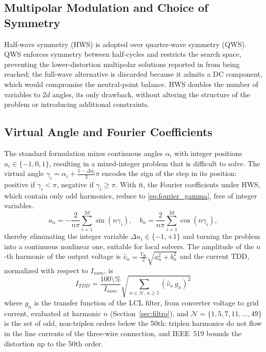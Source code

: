 \documentclass[conference]{IEEEtran}
\newcommand{\pct}{\text{\char`\%}}
\begin{document}
\subsection{Multipolar Modulation and Choice of Symmetry}

Half-wave symmetry (HWS) is adopted over quarter-wave symmetry (QWS). QWS
enforces symmetry between half-cycles and restricts the search space, preventing
the lower-distortion multipolar solutions reported in \cite{birth_genopp} from
being reached; the full-wave alternative is discarded because it admits a DC
component, which would compromise the neutral-point balance. HWS doubles the
number of variables to $2d$ angles, its only drawback, without altering the
structure of the problem or introducing additional constraints.

\subsection{Virtual Angle and Fourier Coefficients}

The standard formulation mixes continuous angles $\alpha_i$ with integer
positions $u_i \in \{-1,0,1\}$, resulting in a mixed-integer problem that is
difficult to solve. The virtual angle
$\gamma_i = \alpha_i + \frac{1-\Delta u_i}{2}\pi$ encodes the sign of the step in
its position: positive if $\gamma_i < \pi$, negative if $\gamma_i \geq \pi$. With
it, the Fourier coefficients under HWS, which contain only odd harmonics, reduce
to \eqref{eq:fourier_gamma}, free of integer variables.
\begin{equation}
    a_n = -\frac{2}{n\pi}\sum_{i=1}^{2d}\sin(n\gamma_i), \quad
    b_n =  \frac{2}{n\pi}\sum_{i=1}^{2d}\cos(n\gamma_i),
    \label{eq:fourier_gamma}
\end{equation}
thereby eliminating the integer variable $\Delta u_i \in \{-1,+1\}$ and turning
the problem into a continuous nonlinear one, suitable for local solvers. The
amplitude of the $n$-th harmonic of the output voltage is
$\hat{v}_n = \frac{V_{dc}}{2}\sqrt{a_n^2+b_n^2}$ and the current TDD, normalized
with respect to $I_{nom}$, is
\begin{equation}
    I_{TDD} = \frac{100\pct}{I_{nom}}
              \sqrt{\sum_{n\in\mathcal{N},\,n\geq5} \left(\hat{v}_n\,g_n\right)^2}
    \label{eq:tdd}
\end{equation}
where $g_n$ is the transfer function of the LCL filter, from converter voltage
to grid current, evaluated at harmonic $n$ (Section~\ref{sec:filtro}), and
$\mathcal{N}=\{1,5,7,11,\dots,49\}$ is the set of odd, non-triplen orders
below the 50th: triplen harmonics do not flow in the line currents of the
three-wire connection, and IEEE~519 bounds the distortion up to the 50th order.
\end{document}
